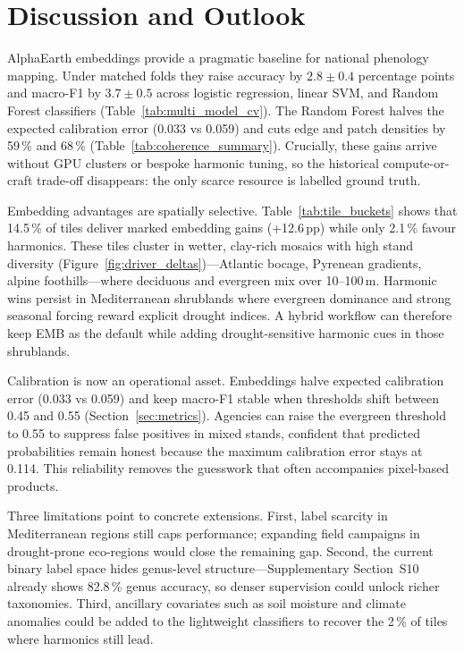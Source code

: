 \documentclass[utf8]{FrontiersinHarvard}
\begin{document}
\section{Discussion and Outlook}

AlphaEarth embeddings provide a pragmatic baseline for national phenology mapping. Under matched folds they raise accuracy by \(2.8 \pm 0.4\) percentage points and macro-F1 by \(3.7 \pm 0.5\) across logistic regression, linear SVM, and Random Forest classifiers (Table~\ref{tab:multi_model_cv}). The Random Forest halves the expected calibration error (0.033 vs 0.059) and cuts edge and patch densities by 59\,\% and 68\,\% (Table~\ref{tab:coherence_summary}). Crucially, these gains arrive without GPU clusters or bespoke harmonic tuning, so the historical compute-or-craft trade-off disappears: the only scarce resource is labelled ground truth.

Embedding advantages are spatially selective. Table~\ref{tab:tile_buckets} shows that 14.5\,\% of tiles deliver marked embedding gains (+12.6\,pp) while only 2.1\,\% favour harmonics. These tiles cluster in wetter, clay-rich mosaics with high stand diversity (Figure~\ref{fig:driver_deltas})—Atlantic bocage, Pyrenean gradients, alpine foothills—where deciduous and evergreen mix over 10--100\,m. Harmonic wins persist in Mediterranean shrublands where evergreen dominance and strong seasonal forcing reward explicit drought indices. A hybrid workflow can therefore keep EMB as the default while adding drought-sensitive harmonic cues in those shrublands.

Calibration is now an operational asset. Embeddings halve expected calibration error (0.033 vs 0.059) and keep macro-F1 stable when thresholds shift between 0.45 and 0.55 (Section~\ref{sec:metrics}). Agencies can raise the evergreen threshold to 0.55 to suppress false positives in mixed stands, confident that predicted probabilities remain honest because the maximum calibration error stays at 0.114. This reliability removes the guesswork that often accompanies pixel-based products.

Three limitations point to concrete extensions. First, label scarcity in Mediterranean regions still caps performance; expanding field campaigns in drought-prone eco-regions would close the remaining gap. Second, the current binary label space hides genus-level structure—Supplementary Section~S10 already shows 82.8\,\% genus accuracy, so denser supervision could unlock richer taxonomies. Third, ancillary covariates such as soil moisture and climate anomalies could be added to the lightweight classifiers to recover the 2\,\% of tiles where harmonics still lead.
\end{document}

